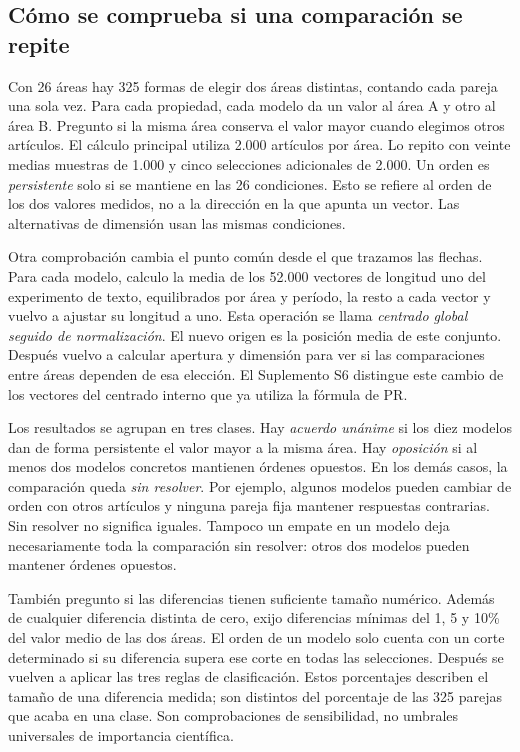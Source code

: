 \documentclass[12pt]{article}
\begin{document}
\subsection{Cómo se comprueba si una comparación se repite}
Con 26 áreas hay 325 formas de elegir dos áreas distintas, contando cada pareja una sola vez. Para cada propiedad, cada modelo da un valor al área A y otro al área B. Pregunto si la misma área conserva el valor mayor cuando elegimos otros artículos. El cálculo principal utiliza 2.000 artículos por área. Lo repito con veinte medias muestras de 1.000 y cinco selecciones adicionales de 2.000. Un orden es \emph{persistente} solo si se mantiene en las 26 condiciones. Esto se refiere al orden de los dos valores medidos, no a la dirección en la que apunta un vector. Las alternativas de dimensión usan las mismas condiciones.

Otra comprobación cambia el punto común desde el que trazamos las flechas. Para cada modelo, calculo la media de los 52.000 vectores de longitud uno del experimento de texto, equilibrados por área y período, la resto a cada vector y vuelvo a ajustar su longitud a uno. Esta operación se llama \emph{centrado global seguido de normalización}. El nuevo origen es la posición media de este conjunto. Después vuelvo a calcular apertura y dimensión para ver si las comparaciones entre áreas dependen de esa elección. El Suplemento S6 distingue este cambio de los vectores del centrado interno que ya utiliza la fórmula de PR.

Los resultados se agrupan en tres clases. Hay \emph{acuerdo unánime} si los diez modelos dan de forma persistente el valor mayor a la misma área. Hay \emph{oposición} si al menos dos modelos concretos mantienen órdenes opuestos. En los demás casos, la comparación queda \emph{sin resolver}. Por ejemplo, algunos modelos pueden cambiar de orden con otros artículos y ninguna pareja fija mantener respuestas contrarias. Sin resolver no significa iguales. Tampoco un empate en un modelo deja necesariamente toda la comparación sin resolver: otros dos modelos pueden mantener órdenes opuestos.

También pregunto si las diferencias tienen suficiente tamaño numérico. Además de cualquier diferencia distinta de cero, exijo diferencias mínimas del 1, 5 y 10\% del valor medio de las dos áreas. El orden de un modelo solo cuenta con un corte determinado si su diferencia supera ese corte en todas las selecciones. Después se vuelven a aplicar las tres reglas de clasificación. Estos porcentajes describen el tamaño de una diferencia medida; son distintos del porcentaje de las 325 parejas que acaba en una clase. Son comprobaciones de sensibilidad, no umbrales universales de importancia científica.
\end{document}
